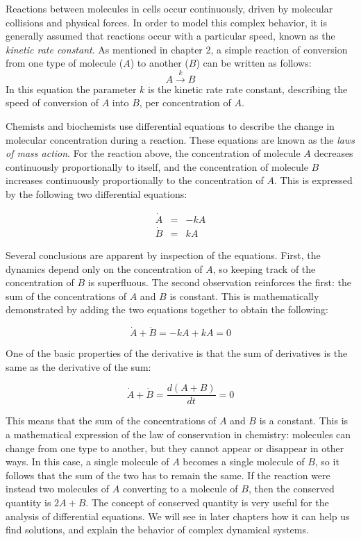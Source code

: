 \documentclass[
  letterpaper,
  DIV=11,
  numbers=noendperiod]{scrreprt}
\begin{document}
Reactions between molecules in cells occur continuously, driven by
molecular collisions and physical forces. In order to model this complex
behavior, it is generally assumed that reactions occur with a particular
speed, known as the  \emph{kinetic rate
constant}. As mentioned in chapter 2, a simple reaction of conversion
from one type of molecule (\(A\)) to another (\(B\)) can be written as
follows: \[ A \xrightarrow{k} B \] In this equation the parameter \(k\)
is the kinetic rate rate constant, describing the speed of conversion of
\(A\) into \(B\), per concentration of \(A\).

Chemists and biochemists use differential equations to describe the
change in molecular concentration during a reaction. These equations are
known as the  \emph{laws of mass
action}. For the reaction above, the concentration of molecule \(A\)
decreases continuously proportionally to itself, and the concentration
of molecule \(B\) increases continuously proportionally to the
concentration of \(A\). This is expressed by the following two
differential equations:

\begin{eqnarray}
\label{eq:lin_chem_kin}
\dot A &=& - k A \\
\dot B &=& kA
\end{eqnarray}

Several conclusions are apparent by inspection of the equations. First,
the dynamics depend only on the concentration of \(A\), so keeping track
of the concentration of \(B\) is superfluous. The second observation
reinforces the first: the sum of the concentrations of \(A\) and \(B\)
is constant. This is mathematically demonstrated by adding the two
equations together to obtain the following:

\[ 
\dot A + \dot B = -kA + kA = 0
\]

One of the basic properties of the derivative is that the sum of
derivatives is the same as the derivative of the sum:

\[
\dot A + \dot B = \frac{d(A+B)}{dt} = 0
\]

This means that the sum of the concentrations of \(A\) and \(B\) is a
constant. This is a mathematical expression of the law of conservation
in chemistry: molecules can change from one type to another, but they
cannot appear or disappear in other ways. In this case, a single
molecule of \(A\) becomes a single molecule of \(B\), so it follows that
the sum of the two has to remain the same. If the reaction were instead
two molecules of \(A\) converting to a molecule of \(B\), then the
conserved quantity is \(2A + B\). The concept of conserved quantity is
very useful for the analysis of differential equations. We will see in
later chapters how it can help us find solutions, and explain the
behavior of complex dynamical systems.
\end{document}

